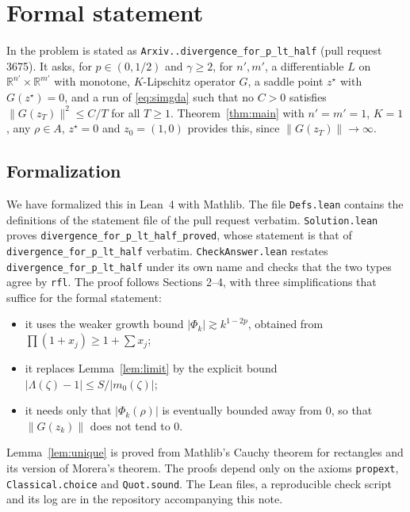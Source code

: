 \documentclass[11pt]{amsart}
\theoremstyle{remark}
\newcommand{\R}{\mathbb{R}}
\newcommand{\lean}[1]{\texttt{#1}}
\begin{document}
\section{Formal statement}\label{sec:formal}

In \cite{FC} the problem is stated as \lean{Arxiv.\guillemotright.divergence\_for\_p\_lt\_half} (pull request 3675).
It asks, for $p\in(0,1/2)$ and $\gamma\ge2$, for $n',m'$, a differentiable $L$ on $\R^{n'}\times\R^{m'}$ with monotone, $K$-Lipschitz operator $G$, a saddle point $z^\star$ with $G(z^\star)=0$, and a run of \eqref{eq:simgda} such that no $C>0$ satisfies $\|G(z_T)\|^2\le C/T$ for all $T\ge1$.
Theorem~\ref{thm:main} with $n'=m'=1$, $K=1$, any $\rho\in A$, $z^\star=0$ and $z_0=(1,0)$ provides this, since $\|G(z_T)\|\to\infty$.

\subsection*{Formalization}
We have formalized this in Lean~4 with Mathlib.
The file \texttt{Defs.lean} contains the definitions of the statement file of the pull request verbatim.
\texttt{Solution.lean} proves \lean{divergence\_for\_p\_lt\_half\_proved}, whose statement is that of \lean{divergence\_for\_p\_lt\_half} verbatim.
\texttt{CheckAnswer.lean} restates \lean{divergence\_for\_p\_lt\_half} under its own name and checks that the two types agree by \lean{rfl}.
The proof follows Sections 2--4, with three simplifications that suffice for the formal statement:
\begin{itemize}
\item it uses the weaker growth bound $|\Phi_k|\gtrsim k^{1-2p}$, obtained from $\prod(1+x_j)\ge1+\sum x_j$;
\item it replaces Lemma~\ref{lem:limit} by the explicit bound $|\Lambda(\zeta)-1|\le S/|m_0(\zeta)|$;
\item it needs only that $|\Phi_k(\rho)|$ is eventually bounded away from $0$, so that $\|G(z_k)\|$ does not tend to $0$.
\end{itemize}
Lemma~\ref{lem:unique} is proved from Mathlib's Cauchy theorem for rectangles and its version of Morera's theorem.
The proofs depend only on the axioms \lean{propext}, \lean{Classical.choice} and \lean{Quot.sound}.
The Lean files, a reproducible check script and its log are in the repository accompanying this note.
\end{document}
